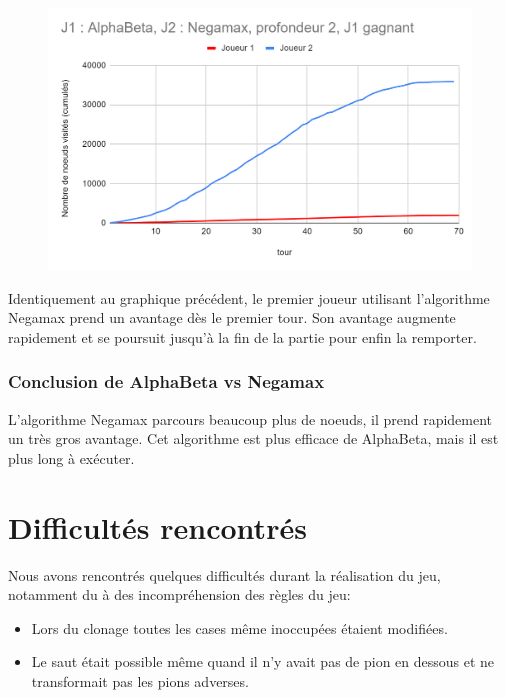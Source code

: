 \documentclass[12pt]{article}
\begin{document}
\begin{figure}[!h]
   \includegraphics[width=\textwidth]{prof2negamaxVSalpha.png}
\end{figure}

Identiquement au graphique précédent, le premier joueur utilisant l'algorithme Negamax prend un avantage dès le premier tour. Son avantage augmente rapidement et se poursuit jusqu'à la fin de la partie pour enfin la remporter.

\subsubsection{Conclusion de AlphaBeta vs Negamax}

L'algorithme Negamax parcours beaucoup plus de noeuds, il prend rapidement un très gros avantage.
Cet algorithme est plus efficace de AlphaBeta, mais il est plus long à exécuter.

\section{Difficultés rencontrés}

Nous avons rencontrés quelques difficultés durant la réalisation du jeu, notamment du à des incompréhension des règles du jeu:\\

\begin{itemize}
    \item Lors du clonage toutes les cases même inoccupées étaient modifiées.
    \item Le saut était possible même quand il n'y avait pas de pion en dessous et ne transformait pas les pions adverses.
\end{itemize}
\end{document}
